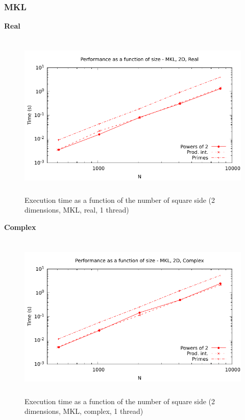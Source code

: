 \documentclass[12pt, a4paper]{article}
\begin{document}
\subsubsection{MKL}
{\bf Real}
\begin{figure}[H]
\captionsetup{width=0.6\textwidth}
\centering
\includegraphics[height=8cm]{graphs/performance/2d-mkl-r.pdf}
\caption{Execution time as a function of the number of square side (2 dimensions, MKL, real, 1 thread)}
\label{2DMKLR}
\end{figure}
{\bf Complex}
\begin{figure}[H]
\captionsetup{width=0.6\textwidth}
\centering
\includegraphics[height=8cm]{graphs/performance/2d-mkl-c.pdf}
\caption{Execution time as a function of the number of square side (2 dimensions, MKL, complex, 1 thread)}
\label{2DMKLC}
\end{figure}
\end{document}
